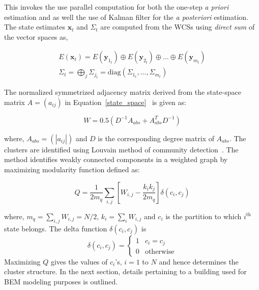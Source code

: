 \noindent This invokes the use parallel computation for both the one-step \textit{a priori} estimation and as well the use of Kalman filter for the \textit{a posteriori} estimation. The state estimates $\textbf{x}_t$ and $\Sigma_t$ are computed from the WCSs using \textit{direct sum} of the vector spaces as,

\begin{equation}
\label{jbs:moment_cl}
\begin{array}{l}
E(\textbf{x}_t) = E(\textbf{y}_{1_t}) \oplus E(\textbf{y}_{2_t}) \oplus \ldots \oplus E(\textbf{y}_{m_t}) \\
\Sigma_t = \displaystyle \bigoplus_j \Sigma_{j_t} = \text{diag}\left( \Sigma_{1_t}, \ldots, \Sigma_{m_t}  \right)
\end{array}
\end{equation}

The normalized symmetrized adjacency matrix derived from the state-space matrix $A = \left( a_{ij}  \right)$ in Equation~\ref{state_space}~\citep{Mukherjee_2017} is given as:

\begin{equation}
\label{symm}
W = 0.5 (D^{-1} A_{abs} + A_{abs}^T D^{-1})
\end{equation}

\noindent where, $A_{abs} = \left( | a_{ij} | \right)$ and $D$ is the corresponding degree matrix of $A_{abs}$. The clusters are identified using Louvain method of community detection~\citep{blondel2008fast}. The method identifies weakly connected components in a weighted graph by maximizing modularity function defined as:

\begin{equation}
Q = \frac{1}{2m_q} \displaystyle \sum_{i,j} \left[W_{i,j} - \frac{k_i k_j}{2m_q} \right] \delta(c_i, c_j)
\end{equation}

\noindent where, $m_q = \sum_{i,j}W_{i,j} = N/2$, $k_i = \sum_i W_{i,j}$ and $c_i$ is the partition to which $i^{\text{th}}$ state belongs. The delta function $\delta(c_i,c_j)$ is 
\begin{equation}
\delta(c_i,c_j) = \begin{cases}
1 & c_i = c_j \\ 0 & \text{otherwise}
\end{cases}
\end{equation}
Maximizing $Q$ gives the values of $c_i$'s, $i = 1$ to $N$ and hence determines the cluster structure. In the next section, details pertaining to a building used for BEM modeling purposes is outlined.




